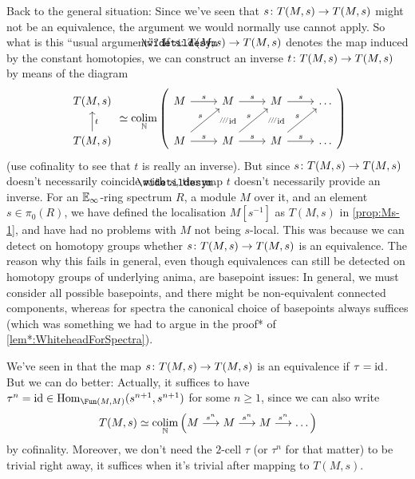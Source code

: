 Back to the general situation: Since we've seen that $s\colon T(M,s)\morphism T(M,s)$ might not be an equivalence, the argument we would normally use cannot apply. So what is this \enquote{usual argument}? If $\snake{s}\colon T(M,s)\morphism T(M,s)$ denotes the map induced by the constant homotopies, we can construct an inverse $t\colon T(M,s)\morphism T(M,s)$ by means of the diagram
\begin{equation*}
	\begin{tikzcd}
		T(M,s)\\
		T(M,s)\uar["t"']
	\end{tikzcd}\simeq\colimit_\IN\left(\begin{tikzcd}
		M\vphantom{T(M,s)}\rar["s"] & M \dar[phantom,"{\scriptscriptstyle /\!/\!/}_{\id}"] \rar["s"] & M\rar["s"]\dar[phantom,"{\scriptscriptstyle /\!/\!/}_{\id}"] & \dotso\\
		M\vphantom{T(M,s)}\rar["s"]\urar["s"] & M\rar["s"]\urar["s"] & M\rar["s"]\urar["s"] & \dotso
	\end{tikzcd}\right)
\end{equation*}
(use cofinality to see that $t$ is really an inverse). But since $s\colon T(M,s)\morphism T(M,s)$ doesn't necessarily coincide with $\snake{s}$, the map $t$ doesn't necessarily provide an inverse.
For an $\mathbb{E}_\infty$-ring spectrum $R$, a module $M$ over it, and an element $s\in \pi_0(R)$, we have defined the localisation $M[s^{-1}]$ as $T(M,s)$ in \cref{prop:Ms-1}, and have had no problems with $M$ not being $s$-local. This was because we can detect on homotopy groups whether $s\colon T(M,s)\morphism T(M,s)$ is an equivalence.  The reason why this fails in general, even though equivalences can still be detected on homotopy groups of underlying anima, are basepoint issues: In general, we must consider all possible basepoints, and there might be non-equivalent connected components, whereas for spectra the canonical choice of basepoints always suffices (which was something we had to argue in the proof* of \cref{lem*:WhiteheadForSpectra}).

\label{rem:BasePointIssuesC}
We've seen in  that the map $s\colon T(M,s)\morphism T(M,s)$ is an equivalence if $\tau=\operatorname{id}$. But we can do better: Actually, it suffices to have $\tau^n=\id\in \Hom_{\Fun(M,M)}(s^{n+1},s^{n+1})$ for some $n\geq 1$, since we can also write
\begin{equation*}
	T(M,s)\simeq \colimit_\IN\left(M\morphism[s^n]M\morphism[s^n]M\morphism[s^n]\dots\right)
\end{equation*}
by cofinality. Moreover, we don't need the $2$-cell $\tau$ (or $\tau^n$ for that matter) to be trivial right away, it suffices when it's trivial after mapping to $T(M,s)$.


